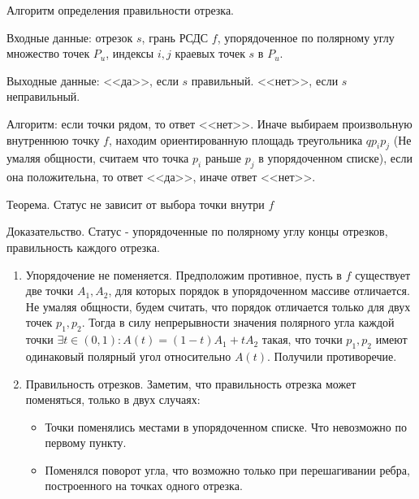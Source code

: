 \documentclass[letterpaper,12pt]{article}
\begin{document}
\begin{center}
      Алгоритм определения правильности отрезка.
\end{center}

Входные данные: отрезок $s$, грань РСДС $f$, упорядоченное по 
полярному углу множество точек $P_u$, индексы $i, j$ краевых точек $s$
в $P_u$.

Выходные данные: <<да>>, если $s$ правильный. <<нет>>, если $s$ 
неправильный.

Алгоритм: если точки рядом, то ответ <<нет>>. Иначе
выбираем произвольную внутреннюю точку $f$, находим ориентированную
площадь треугольника $q p_i p_j$ (Не умаляя общности, считаем что
точка $p_i$ раньше $p_j$ в упорядоченном списке), если она положительна,
то ответ <<да>>, иначе ответ <<нет>>.

\hspace{4em}

\begin{center}
      Теорема. Статус не зависит от выбора точки внутри $f$
\end{center}
Доказательство.
Статус - упорядоченные по полярному углу концы отрезков, правильность каждого 
отрезка.
\begin{enumerate}
      \item Упорядочение не поменяется.
            Предположим противное, пусть в $f$ существует две точки $A_1, A_2$, 
            для которых порядок в упорядоченном массиве отличается. Не умаляя 
            общности, будем считать, что порядок отличается только для двух
            точек $p_1, p_2$. Тогда в силу непрерывности значения полярного 
            угла каждой точки  $\exists t \in (0, 1) : A(t) = (1 - t)A_1 + tA_2$ 
            такая, что точки $p_1, p_2$ имеют одинаковый полярный угол 
            относительно $ A(t) $. Получили противоречие. 
      \item Правильность отрезков.
            Заметим, что правильность отрезка может поменяться, только в двух 
            случаях:
            \begin{itemize}
                  \item Точки поменялись местами в упорядоченном списке. Что 
                        невозможно по первому пункту.
                  \item Поменялся поворот угла, что возможно только при 
                        перешагивании ребра, построенного на точках одного 
                        отрезка.
            \end{itemize}
\end{enumerate}
\end{document}
